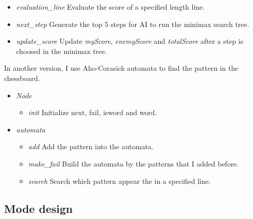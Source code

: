 \documentclass[10pt,twocolumn,letterpaper]{article}
\begin{document}
\begin{itemize}
    \begin{itemize}
        \item 
        \emph{evaluation\_line}
        Evaluate the score of a specified length line.
    \end{itemize}
    \begin{itemize}
        \item 
        \emph{next\_step}
        Generate the top 5 steps for AI to run the minimax search tree.
    \end{itemize}
    \begin{itemize}
        \item 
        \emph{update\_score}
        Update \emph{myScore}, \emph{enemyScore} and \emph{totalScore} after a step is choosed in the minimax tree.
    \end{itemize}
\end{itemize}

In another version, I use Aho-Corasick automata to find the pattern in the chessboard.

\begin{itemize}
    \item 
    \emph{Node}
    \begin{itemize}
        \item 
        \emph{init}
        Initialize next, fail, isword and word.
    \end{itemize}
\end{itemize}
\begin{itemize}
    \item 
    \emph{automata}
    \begin{itemize}
        \item 
        \emph{add}
        Add the pattern into the automata.
    \end{itemize}
    \begin{itemize}
        \item 
        \emph{make\_fail}
        Build the automata by the patterns that I added before.
    \end{itemize}
    \begin{itemize}
        \item 
        \emph{search}
        Search which pattern appear the in a specified line.
    \end{itemize}
\end{itemize}

\subsection{Mode design}
\end{document}
